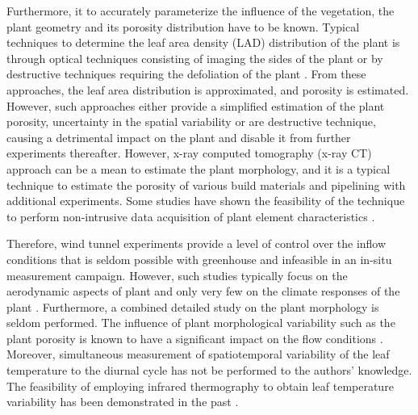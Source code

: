 Furthermore, it to accurately parameterize the influence of the vegetation, the plant geometry and its porosity distribution have to be known. Typical techniques to determine the leaf area density (LAD) distribution of the plant is through optical techniques consisting of imaging the sides of the plant \citep{Cao2012, Grant1998, Guan2003, Manickathan2018b, Phattaralerphong2005} or by destructive techniques requiring the defoliation of the plant \citep{Jonckheere2004, ONeal2002}. From these approaches, the leaf area distribution is approximated, and porosity is estimated. However, such approaches either provide a simplified estimation of the plant porosity, uncertainty in the spatial variability or are destructive technique, causing a detrimental impact on the plant and disable it from further experiments thereafter. However, x-ray computed tomography (x-ray CT) approach can be a mean to estimate the plant morphology, and it is a typical technique to estimate the porosity of various build materials \citep{Lal2017,Parada2017,Patera2018} and pipelining with additional experiments. Some studies have shown the feasibility of the technique to perform non-intrusive data acquisition of plant element characteristics \citep{Brodersen2013, Dhondt2010}.

Therefore, wind tunnel experiments provide a level of control over the inflow conditions that is seldom possible with greenhouse and infeasible in an in-situ measurement campaign. However, such studies typically focus on the aerodynamic aspects of plant and only very few on the climate responses of the plant \citep{Grace1977}. Furthermore, a combined detailed study on the plant morphology is seldom performed. The influence of plant morphological variability such as the plant porosity is known to have a significant impact on the flow conditions \citep{Bitog2011,Cao2012,Manickathan2018b}. Moreover, simultaneous measurement of spatiotemporal variability of the leaf temperature to the diurnal cycle has not be performed to the authors’ knowledge. The feasibility of employing infrared thermography to obtain leaf temperature variability has been demonstrated in the past \citep{Jones1999,Merlot2002}.


